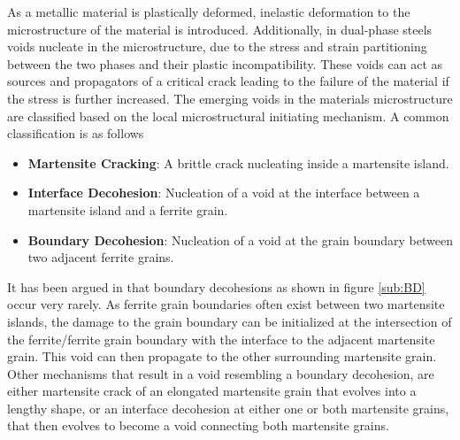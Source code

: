 


As a metallic material is plastically deformed, inelastic deformation to the microstructure of the material is introduced. Additionally, in dual-phase steels voids nucleate in the microstructure, due to the stress and strain partitioning between the two phases and their plastic incompatibility. These voids can act as sources and propagators of a critical crack leading to the failure of the material if the stress is further increased. The emerging voids in the materials microstructure are classified based on the local microstructural initiating mechanism. A common classification is as follows
\begin{itemize}[label={}]
\item \textbf{Martensite Cracking}: A brittle crack nucleating inside a martensite island.
\item \textbf{Interface Decohesion}: Nucleation of a void at the interface between a martensite island and a ferrite grain.
\item \textbf{Boundary Decohesion}: Nucleation of a void at the grain boundary between two adjacent ferrite grains.
\end{itemize}
It has been argued in \cite{Azuma2013} that boundary decohesions as shown in figure \ref{sub:BD} occur very rarely. As ferrite grain boundaries often exist between two martensite islands, the damage to the grain boundary can be initialized at the intersection of the ferrite/ferrite grain boundary with the interface to the adjacent martensite grain. This void can then propagate to the other surrounding martensite grain. Other mechanisms that result in a void resembling a boundary decohesion, are either martensite crack of an elongated martensite grain that evolves into a lengthy shape, or an interface decohesion at either one or both martensite grains, that then evolves to become a void connecting both martensite grains.\\

